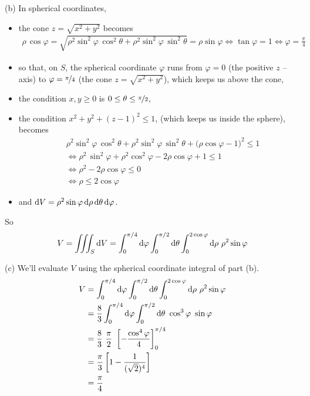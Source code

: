 \begin{solution}
(b) In spherical coordinates, 
\begin{itemize}
\item 
the cone $z=\sqrt{x^2+y^2}$ becomes
\begin{align*}
\rho\,\cos\varphi =\sqrt{\rho^2\sin^2\varphi\,\cos^2\theta
                         +\rho^2\sin^2\varphi\,\sin^2\theta}
                  =\rho\sin\varphi
\iff \tan\varphi=1
\iff \varphi=\frac{\pi}{4}
\end{align*}
\item
so that, on $S$, the spherical coordinate $\varphi$ runs from $\varphi=0$
(the positive $z$ --axis) to $\varphi=\nicefrac{\pi}{4}$
(the cone $z=\sqrt{x^2+y^2}$), which keeps us above the cone,
\item
the condition $x,y\ge 0$ is $0\le\theta\le\nicefrac{\pi}{2}$,
\item
the condition $x^2+y^2+(z-1)^2\le 1$, (which keeps us inside the sphere),
becomes
\begin{align*}
&\rho^2\sin^2\varphi\,\cos^2\theta + \rho^2\sin^2\varphi\,\sin^2\theta
      +\big(\rho\cos\varphi-1\big)^2\le 1 \\
&\iff \rho^2\,\sin^2\varphi +\rho^2\cos^2\varphi -2\rho\cos\varphi +1  \le 1 \\
&\iff \rho^2-2\rho\cos\varphi\le 0 \\
&\iff \rho\le 2 \cos\varphi             
\end{align*}
\item
and $\mathrm{d}V = \rho^2\sin\varphi\,\mathrm{d}\rho\,\mathrm{d}\theta\,\mathrm{d}\varphi$.
\end{itemize}
So
\begin{align*}
V = \iiint_S\mathrm{d}V
  = \int_0^{\pi/4}\mathrm{d}\varphi \int_0^{\pi/2}\mathrm{d}\theta
               \int_0^{2\cos\varphi}\mathrm{d}\rho\ \rho^2\sin\varphi 
\end{align*}

(c) We'll evaluate $V$ using the spherical coordinate integral of part (b).
\begin{align*}
V &= \int_0^{\pi/4}\dee{\varphi} \int_0^{\pi/2}\dee{\theta}
               \int_0^{2\cos\varphi}\dee{\rho}\ \rho^2\sin\varphi  \\
&=\frac{8}{3} \int_0^{\pi/4}\dee{\varphi} \int_0^{\pi/2}\dee{\theta}\ 
               \cos^3\varphi\ \sin\varphi \\
&=\frac{8}{3}\ \frac{\pi}{2}\ \left[-\frac{\cos^4\varphi}{4}\right]_0^{\pi/4} \\
&=\frac{\pi}{3} \left[1-\frac{1}{(\sqrt{2})^4}\right] \\
&=\frac{\pi}{4}
\end{align*}
\end{solution}

